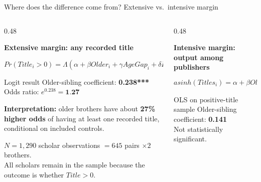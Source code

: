 \documentclass[aspectratio=169,10pt]{beamer}
\begin{document}
\begin{frame}{Where does the difference come from? Extensive vs.\ intensive margin}

\begin{columns}[T,onlytextwidth]

\begin{column}{0.48\textwidth}

\textbf{Extensive margin: any recorded title}

\vspace{0.15em}

\[
Pr(Title_i>0)
=
\Lambda\!\left(
\alpha
+\beta Older_i
+\gamma AgeGap_i


+\delta FatherAcademia_i
\right))
\]

\begin{block}{Logit result}
\footnotesize
Older-sibling coefficient: \textbf{0.238***}\\
Odds ratio: \(e^{0.238}=\textbf{1.27}\)

\vspace{0.20em}

\textbf{Interpretation:}
older brothers have about \textbf{27\% higher odds}
of having at least one recorded title,
conditional on included controls.
\end{block}

{\scriptsize
\(N=1{,}290\) scholar observations
\(=645\) pairs \(\times 2\) brothers.\\
All scholars remain in the sample because the outcome is
whether \(Title>0\).
}

\end{column}

\begin{column}{0.48\textwidth}

\textbf{Intensive margin: output among publishers}

\vspace{0.15em}

\[
asinh(Titles_i)
=
\alpha
+\beta Older_i
+\gamma AgeGap_i


+\delta FatherAcademia_i
+\varepsilon_i
\]

\begin{block}{OLS on positive-title sample}
\footnotesize
Older-sibling coefficient: \textbf{0.141}\\
Not statistically significant.
\end{block}


\end{column}
\end{columns}
\end{frame}
\end{document}
